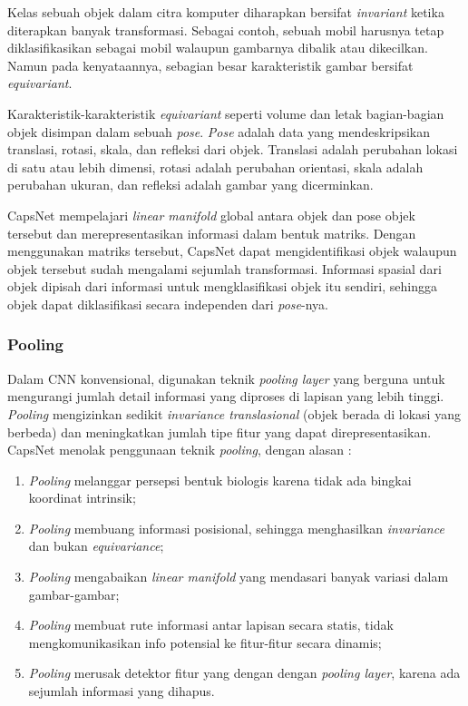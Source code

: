 \documentclass{article}
\begin{document}
	   	\par
	   	Kelas sebuah objek dalam citra komputer diharapkan bersifat \textit{invariant} ketika diterapkan banyak transformasi. Sebagai contoh, sebuah mobil harusnya tetap diklasifikasikan sebagai mobil walaupun gambarnya dibalik atau dikecilkan. Namun pada kenyataannya, sebagian besar karakteristik gambar bersifat \textit{equivariant}. 
	   	\par
	   	Karakteristik-karakteristik \textit{equivariant} seperti volume dan letak bagian-bagian objek disimpan dalam sebuah \textit{pose}. \textit{Pose} adalah data yang mendeskripsikan translasi, rotasi, skala, dan refleksi dari objek. Translasi adalah perubahan lokasi di satu atau lebih dimensi, rotasi adalah perubahan orientasi, skala adalah perubahan ukuran, dan refleksi adalah gambar yang dicerminkan. 
	   	\par
	   	CapsNet mempelajari \textit{linear manifold} global antara objek dan pose objek tersebut dan merepresentasikan informasi dalam bentuk matriks. Dengan menggunakan matriks tersebut, CapsNet dapat mengidentifikasi objek walaupun objek tersebut sudah mengalami sejumlah transformasi. Informasi spasial dari objek dipisah dari informasi untuk mengklasifikasi objek itu sendiri, sehingga objek dapat diklasifikasi secara independen dari \textit{pose}-nya.\cite{hinton_2}
	   	
	   	\subsubsection{Pooling}
	   	Dalam CNN konvensional, digunakan teknik \textit{pooling layer} yang berguna untuk mengurangi jumlah detail informasi yang diproses di lapisan yang lebih tinggi. \textit{Pooling} mengizinkan sedikit \textit{invariance translasional} (objek berada di lokasi yang berbeda) dan meningkatkan jumlah tipe fitur yang dapat direpresentasikan. CapsNet menolak penggunaan teknik \textit{pooling}, dengan alasan :
	   	
	   	\begin{enumerate}
	   	 \item \textit{Pooling} melanggar persepsi bentuk biologis karena tidak ada bingkai koordinat intrinsik;
	   	 \item \textit{Pooling} membuang informasi posisional, sehingga menghasilkan \textit{invariance} dan bukan \textit{equivariance};
	   	 \item \textit{Pooling} mengabaikan \textit{linear manifold} yang mendasari banyak variasi dalam gambar-gambar;
	   	 \item \textit{Pooling} membuat rute informasi antar lapisan secara statis, tidak mengkomunikasikan info potensial ke fitur-fitur secara dinamis;
	   	 \item \textit{Pooling} merusak detektor fitur yang dengan dengan \textit{pooling layer}, karena ada sejumlah informasi yang dihapus.
	   	\end{enumerate}
	   	
\end{document}
